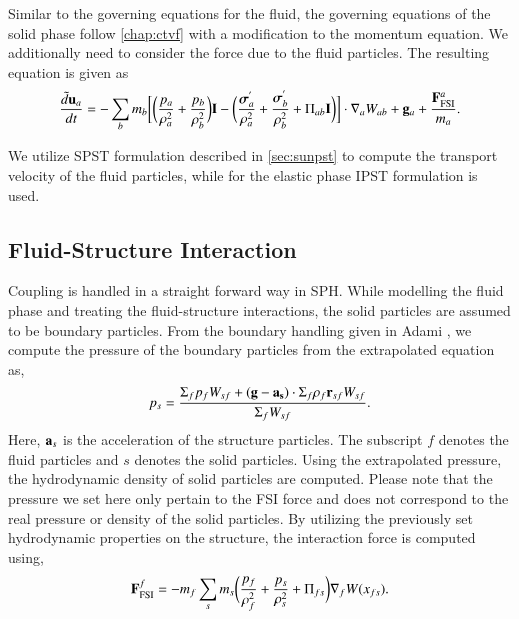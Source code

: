 Similar to the governing equations for the fluid, the governing equations of
the solid phase follow \cref{chap:ctvf} with a modification to the momentum
equation. We additionally need to consider the force due to the
fluid particles. The resulting equation is given as
\begin{multline}
  \label{eq:fsi:sph-momentum-solid}
  \frac{\tilde{d}\mathbf{u}_{a}}{dt} = - \sum_{b} m_b \bigg[
  \bigg(\frac{p_a}{\rho_a^2} + \frac{p_b}{\rho_b^2}\bigg) \mathbf{I} -
  \bigg(\frac{\boldsymbol{\sigma}^{'}_{a}}{\rho_a^2} +
  \frac{\boldsymbol{\sigma}^{'}_{b}}{\rho_b^2} + \Pi_{ab} \mathbf{I} \bigg) \bigg]  \cdot \nabla_{a} W_{ab}
  + \mathbf{g}_{a} + \frac{\mathbf{F}^a_{\text{FSI}}}{m_a}.
\end{multline}

We utilize SPST formulation described in \cref{sec:sunpst} to compute the
transport velocity of the fluid particles, while for the elastic phase
IPST \citep{huang_kernel_2019} formulation is used.

\subsection{Fluid-Structure Interaction}\label{subsec:fsi}
Coupling is handled in a straight forward way in SPH. While modelling the fluid
phase and treating the fluid-structure interactions, the solid particles are
assumed to be boundary particles. From the boundary handling given in Adami
\citep{Adami2012}, we compute the pressure of the boundary particles from
the extrapolated equation as,
\begin{equation}
  \label{eq:fsi:pressure-bc}
  p_s = \frac{\Sigma_f p_f W_{sf} + (\mathbf{g} - \mathbf{a}_{\mathbf{s}}) \cdot \Sigma_f
    \rho_f \mathbf{r}_{sf} W_{sf}}{\Sigma_f W_{sf}}.
\end{equation}
Here, $\mathbf{a}_s$ is the acceleration of the structure particles. The subscript
$f$ denotes the fluid particles and $s$ denotes the solid particles. Using the
extrapolated pressure, the hydrodynamic density of solid particles are
computed. Please note that the pressure we set here only pertain to the
FSI force and does not correspond to the real pressure or density of the
solid particles. By utilizing the previously set hydrodynamic properties on
the structure, the interaction force is computed using,
\begin{equation}
  \mathbf{F}_{\text{FSI}}^f = -m_f \sum_{s} m_s \bigg(\frac{p_f}{\rho_{f}^2} +
  \frac{p_s}{\rho_{s}^2} + \Pi_{fs} \bigg) \nabla_{f} W(x_{fs}).
\end{equation}


